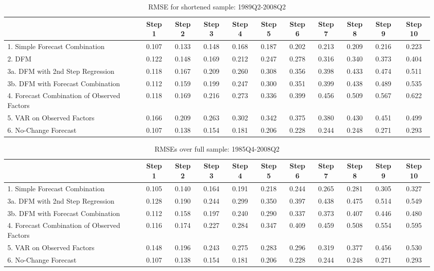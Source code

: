 \documentclass[11pt]{article}
\begin{document}
\begin{frame}
\newpage
{\normalsize \clearpage
\begin{table}
\center
\caption{RMSE for shortened sample: 1989Q2-2008Q2}
\begin{tabular}{|l|c|c|c|c|c|c|c|c|c|c|}
\hline
&Step 1 &Step 2 &Step 3 &Step 4 &Step 5 &Step 6 &Step 7 &Step 8 &Step 9 &Step 10\\
\hline
1. Simple Forecast Combination             &0.107&0.133&0.148&0.168&0.187&0.202&0.213&0.209&0.216&0.223\\
2. DFM                                     &0.122&0.148&0.169&0.212&0.247&0.278&0.316&0.340&0.373&0.404\\
3a. DFM with 2nd Step Regression           &0.118&0.167&0.209&0.260&0.308&0.356&0.398&0.433&0.474&0.511\\
3b. DFM with Forecast Combination          &0.112&0.159&0.199&0.247&0.300&0.351&0.399&0.438&0.489&0.535\\
4. Forecast Combination of Observed Factors&0.118&0.169&0.216&0.273&0.336&0.399&0.456&0.509&0.567&0.622\\
5. VAR on Observed Factors                 &0.166&0.209&0.263&0.302&0.342&0.375&0.380&0.430&0.451&0.499\\
6. No-Change Forecast                      &0.107&0.138&0.154&0.181&0.206&0.228&0.244&0.248&0.271&0.293\\
\hline
\end{tabular}
\end{table}
}

\newpage
{\normalsize \clearpage
\begin{table}
\caption{RMSEs over full sample: 1985Q4-2008Q2}
\center
\begin{tabular}{|l|c|c|c|c|c|c|c|c|c|c|}
\hline
&Step 1 &Step 2 &Step 3 &Step 4 &Step 5 &Step 6 &Step 7 &Step 8 &Step 9 &Step 10\\
\hline
1. Simple Forecast Combination             &0.105&0.140&0.164&0.191&0.218&0.244&0.265&0.281&0.305&0.327\\
3a. DFM with 2nd Step Regression           &0.128&0.190&0.244&0.299&0.350&0.397&0.438&0.475&0.514&0.549\\
3b. DFM with Forecast Combination          &0.112&0.158&0.197&0.240&0.290&0.337&0.373&0.407&0.446&0.480\\
4. Forecast Combination of Observed Factors&0.116&0.174&0.227&0.284&0.347&0.409&0.459&0.508&0.554&0.595\\
5. VAR on Observed Factors                 &0.148&0.196&0.243&0.275&0.283&0.296&0.319&0.377&0.456&0.530\\
6. No-Change Forecast                      &0.107&0.138&0.154&0.181&0.206&0.228&0.244&0.248&0.271&0.293\\
\hline
\end{tabular}
\end{table}
}


\end{frame}
\end{document}
